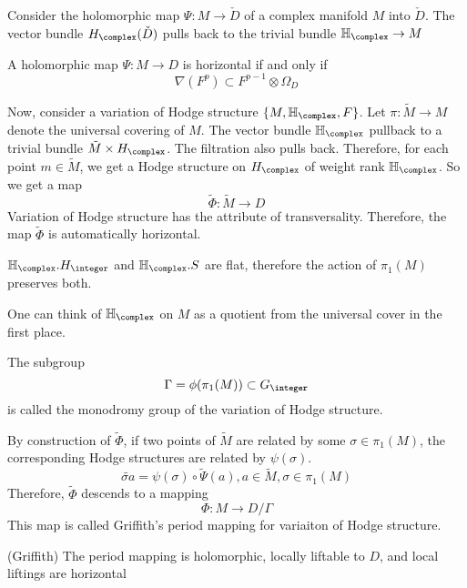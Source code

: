 \documentclass{article}
\begin{document}
Consider the holomorphic map $\Psi: M \rightarrow \check{D}$ of a complex manifold $M$ into 
$\check{D}$. The vector bundle $H_{\complex}(\check{D})$ pulls back to the trivial bundle
$\mathbb{H_{\complex}} \rightarrow M$

A holomorphic map $\Psi: M \rightarrow D$ is horizontal if and only if 
\[
    \nabla(F^p) \subset F^{p-1}\otimes\Omega_{D}
\]

\newcommand{\VHS}{\mathbb{H}_{\complex}}
Now, consider a variation of Hodge structure $\{M, \VHS, F\}$. Let $\pi: \tilde{M} \rightarrow M$
denote the universal covering of $M$. The vector bundle $\VHS$ pullback to a trivial bundle
$\tilde{M}\times H_{\complex}$. The filtration also pulls back. Therefore, for each point 
$m \in \tilde{M}$, we get a Hodge structure on $H_{\complex}$ of weight rank $\VHS$. So we get
a map
\[
    \tilde{\Phi}: \tilde{M} \rightarrow D
\]
Variation of Hodge structure has the attribute of transversality. Therefore, the map $\tilde{\Phi}$
is automatically horizontal.

$\VHS.H_{\integer}$ and $\VHS.S$ are flat, therefore the action of $\pi_1(M)$ preserves both. 

One can think of $\VHS$ on $M$ as a quotient from the universal cover in the first place.

The subgroup
\[
    \Gamma = \phi(\pi_1(M)) \subset G_{\integer}
\]
is called the monodromy group of the variation of Hodge structure. 

By construction of $\tilde{\Phi}$, if two points of $\tilde{M}$ are 
related by some $\sigma \in \pi_1(M)$, the corresponding Hodge structures are related by
$\psi(\sigma)$.
\[
    \tilde{\sigma a} = \psi(\sigma)\circ\tilde{\Psi}(a), a \in \tilde{M}, \sigma \in \pi_1(M)
\]
Therefore, $\tilde{\Phi}$ descends to a mapping
\[
    \Phi: M \rightarrow D/\Gamma
\]
This map is called Griffith's period mapping for variaiton of Hodge structure. 

\begin{theorem}(Griffith)
The period mapping is holomorphic, locally liftable to $D$, and local liftings are horizontal
\end{theorem}
\end{document}
